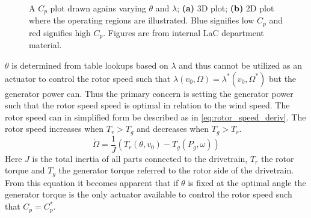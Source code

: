 \begin{figure}[ht]
	\centering
	
	\hfil
	
	\caption{A $ C_p $ plot drawn agains varying $ \theta $ and $ \lambda $; \textbf{(a)} 3D plot; \textbf{(b)} 2D plot where the operating regions are illustrated. Blue signifies low $ C_p $ and red signifies high $ C_p $. Figures are from internal LaC department material.}
	\label{fig:cp_plot}
\end{figure}

$ \theta $ is determined from table lookups based on $ \lambda $ and thus cannot be utilized as an actuator to control the rotor speed such that $ \lambda(v_0, \Omega) = \lambda^*(v_0, \Omega^*) $ but the generator power can. Thus the primary concern is setting the generator power such that the rotor speed speed is optimal in relation to the wind speed. The rotor speed can in simplified form be described as in \cref{eq:rotor_speed_deriv}. The rotor speed increases when $ T_r > T_g $ and decreases when $ T_g > T_r $.
\begin{equation}\label{eq:rotor_speed_deriv}
	\dot{\Omega} = \dfrac{1}{J} \left( T_r(\theta, v_0) - T_g(P_g, \omega) \right)
\end{equation}
Here $ J $ is the total inertia of all parts connected to the drivetrain, $ T_r $ the rotor torque and $ T_g $ the generator torque referred to the rotor side of the drivetrain. From this equation it becomes apparent that if $ \theta $ is fixed at the optimal angle the generator torque is the only actuator available to control the rotor speed such that $ C_p = C_p^* $.

